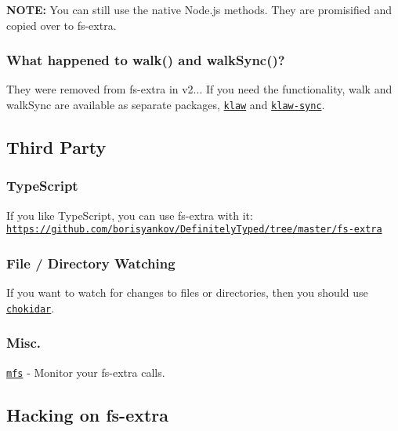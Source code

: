 {\bfseries N\+O\+TE\+:} You can still use the native Node.\+js methods. They are promisified and copied over to {\ttfamily fs-\/extra}.

\subsubsection*{What happened to {\ttfamily walk()} and {\ttfamily walk\+Sync()}?}

They were removed from {\ttfamily fs-\/extra} in v2... If you need the functionality, {\ttfamily walk} and {\ttfamily walk\+Sync} are available as separate packages, \href{https://github.com/jprichardson/node-klaw}{\tt {\ttfamily klaw}} and \href{https://github.com/manidlou/node-klaw-sync}{\tt {\ttfamily klaw-\/sync}}.

\subsection*{Third Party }

\subsubsection*{Type\+Script}

If you like Type\+Script, you can use {\ttfamily fs-\/extra} with it\+: \href{https://github.com/borisyankov/DefinitelyTyped/tree/master/fs-extra}{\tt https\+://github.\+com/borisyankov/\+Definitely\+Typed/tree/master/fs-\/extra}

\subsubsection*{File / Directory Watching}

If you want to watch for changes to files or directories, then you should use \href{https://github.com/paulmillr/chokidar}{\tt chokidar}.

\subsubsection*{Misc.}


\begin{DoxyItemize}
\item \href{https://github.com/cadorn/mfs}{\tt mfs} -\/ Monitor your fs-\/extra calls.
\end{DoxyItemize}

\subsection*{Hacking on fs-\/extra }

